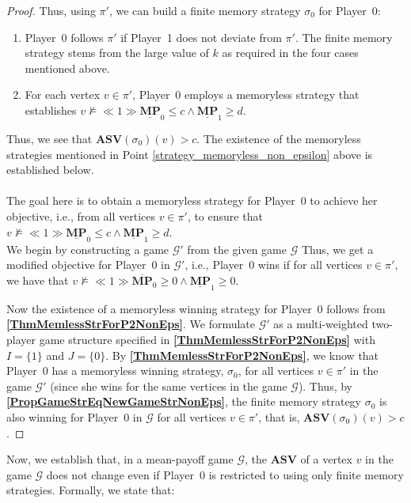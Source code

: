 \begin{proof}
Thus, using $\pi'$, we can build a finite memory strategy $\sigma_0$ for Player~0:
\begin{enumerate}
    \item Player~0 follows $\pi'$ if Player~1 does not deviate from $\pi'$. The finite memory strategy stems from the large value of $k$ as required in the four cases mentioned above.
    \item \label{strategy_memoryless_non_epsilon} For each vertex $v \in \pi'$, Player~0 employs a memoryless strategy that establishes $v \nvDash \ll 1 \gg \underline{\mathbf{MP}}_0 \leqslant c \land \underline{\mathbf{MP}}_1 \geqslant d$.
\end{enumerate}
Thus, we see that $\mathbf{ASV}(\sigma_0)(v) > c$.
The existence of the memoryless strategies mentioned in Point \ref{strategy_memoryless_non_epsilon} above is established below. \\ \\
\noindent The goal here is to obtain a memoryless strategy for Player~0 to achieve her objective, i.e., from all vertices $v \in \pi'$, to ensure that $v \nvDash \ll 1 \gg \underline{\mathbf{MP}}_0 \leqslant c \land \underline{\mathbf{MP}}_1 \geqslant d$. \\
\noindent We begin by constructing a game $\mathcal{G'}$ from the given game $\mathcal{G}$ Thus, we get a modified objective for Player~0 in $\mathcal{G'}$, i.e., Player~0 wins if for all vertices $v \in \pi'$, we have that $v \nvDash \ll 1 \gg \overline{\mathbf{MP}}_0 \geqslant 0 \land \underline{\mathbf{MP}}_1 \geqslant 0$.

Now the existence of a memoryless winning strategy for Player~0 follows from \textbf{\cref{ThmMemlessStrForP2NonEps}}. We formulate $\mathcal{G'}$ as a multi-weighted two-player game structure specified in \textbf{\cref{ThmMemlessStrForP2NonEps}} with $I = \{1\}$ and $J = \{0\}$. By \textbf{\cref{ThmMemlessStrForP2NonEps}}, we know that Player~0 has a memoryless winning strategy, $\sigma_0$,  for all vertices $v \in \pi'$ in the game $\mathcal{G'}$ (since she wins for the same vertices in the game $\mathcal{G}$). Thus, by \textbf{\cref{PropGameStrEqNewGameStrNonEps}}, the finite memory strategy $\sigma_0$ is also winning for Player~0 in $\mathcal{G}$ for all vertices $v \in \pi'$, that is, $\mathbf{ASV}(\sigma_0)(v) > c$.
\end{proof}

Now, we establish that, in a mean-payoff game $\mathcal{G}$, the $\mathbf{ASV}$ of a vertex $v$ in the game $\mathcal{G}$ does not change even if Player~0 is restricted to using only finite memory strategies. Formally, we state that:

